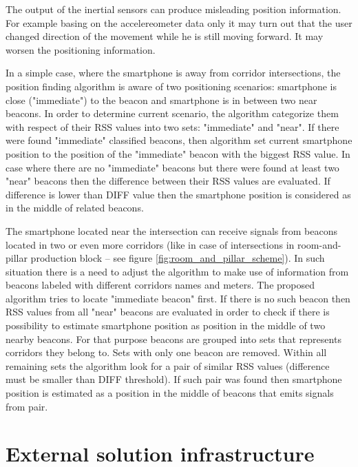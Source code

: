 \documentclass[../main.tex]{subfiles}
\begin{document}
The output of the inertial sensors can produce misleading position information. For example basing on the accelereometer data only it may turn out that the user changed direction of the movement while he is still moving forward. It may worsen the positioning information.

In a simple case, where the smartphone is away from corridor intersections, the position finding algorithm is aware of two positioning scenarios: smartphone is close ("immediate") to the beacon and smartphone is in between two near beacons. In order to determine current scenario, the algorithm categorize them with respect of their RSS values into two sets: "immediate" and "near". If there were found "immediate" classified beacons, then algorithm set current smartphone position to the position of the "immediate" beacon with the biggest RSS value. In case where there are no "immediate" beacons but there were found at least two "near" beacons then the difference between their RSS values are evaluated. If difference is lower than DIFF value then the smartphone position is considered as in the middle of related beacons.

The smartphone located near the intersection can receive signals from beacons located in two or even more corridors (like in case of intersections in room-and-pillar production block -- see figure \ref{fig:room_and_pillar_scheme}). In such situation there is a need to adjust the algorithm to make use of information from beacons labeled with different corridors names and meters. The proposed algorithm tries to locate "immediate beacon" first. If there is no such beacon then RSS values from all "near" beacons are evaluated in order to check if there is possibility to estimate smartphone position as position in the middle of two nearby beacons. For that purpose beacons are grouped into sets that represents corridors they belong to. Sets with only one beacon are removed. Within all remaining sets the algorithm look for a pair of similar RSS values (difference must be smaller than DIFF threshold). If such pair was found then smartphone position is estimated as a position in the middle of beacons that emits signals from pair.


\section{External solution infrastructure} %
\label{sec:external_solution_infrastructure}
\end{document}
